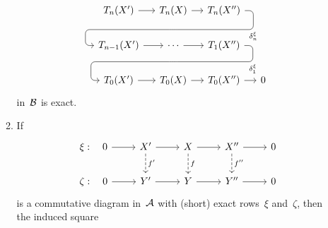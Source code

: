 \begin{definition}
\begin{enumerate}
\begin{enumerate}[label=(H$\delta$\arabic*)]
\[\begin{tikzcd}[column sep = small]
              \\
                T_n(X')
                \arrow{r}
              & T_n(X)
                \arrow{r}
                \arrow[d, phantom, ""{coordinate, name=Z2}]
              & T_n(X'')
                \arrow[ dll,
                        "\delta^\xi_n",
                        rounded corners,
                        to path={ -- ([xshift=2ex]\tikztostart.east)
                                  |- (Z2) \tikztonodes
                                  -| ([xshift=-2ex]\tikztotarget.west)
                                  -- (\tikztotarget)}
                      ]
              & {}
              \\
                T_{n-1}(X')
                \arrow{r}
              & \dotsb
                \arrow{r}
                \arrow[d, phantom, ""{coordinate, name=Z3}]
              & T_1(X'')
                \arrow[ dll,
                        "\delta^\xi_1",
                        rounded corners,
                        to path={ -- ([xshift=2ex]\tikztostart.east)
                                  |- (Z3) \tikztonodes
                                  -| ([xshift=-2ex]\tikztotarget.west)
                                  -- (\tikztotarget)}
                      ]
              & {}
              \\
                T_0(X')
                \arrow{r}
              & T_0(X)
                \arrow{r}
              & T_0(X'')
                \arrow{r}
              & 0
            \end{tikzcd}
          \]
          in~$\mathcal{B}$ is exact.
        \item
          If
          \[
            \begin{tikzcd}
                \xi:
                \quad
                0
                \arrow{r}
              & X'
                \arrow{r}
                \arrow[dashed]{d}[right]{f'}
              & X
                \arrow{r}
                \arrow[dashed]{d}[right]{f}
              & X''
                \arrow{r}
                \arrow[dashed]{d}[right]{f''}
              & 0
              \\
                \zeta:
                \quad
                0
                \arrow{r}
              & Y'
                \arrow{r}
              & Y
                \arrow{r}
              & Y''
                \arrow{r}
              & 0
            \end{tikzcd}
          \]
          is a commutative diagram in~$\mathcal{A}$ with (short) exact rows~$\xi$ and~$\zeta$, then the induced square

\end{enumerate}
\end{enumerate}
\end{definition}
